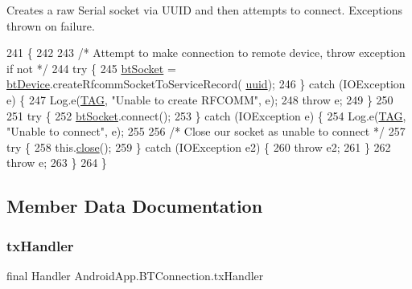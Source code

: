 Creates a raw Serial socket via U\+U\+ID and then attempts to connect. Exceptions thrown on failure. 
\begin{DoxyCode}
241                                               \{
242 
243         \textcolor{comment}{/* Attempt to make connection to remote device, throw exception if not */}
244         \textcolor{keywordflow}{try} \{
245             \hyperlink{class_android_app_1_1_b_t_connection_af3cdc6c880b28361d87d0118ace0e49c}{btSocket} = \hyperlink{class_android_app_1_1_b_t_connection_a3ed1e51b0f24f0b20ca5c27270f2999c}{btDevice}.createRfcommSocketToServiceRecord(
      \hyperlink{class_android_app_1_1_b_t_connection_a0e531d4cad0e5cca1e5b4446551b5c63}{uuid});
246         \} \textcolor{keywordflow}{catch} (IOException e) \{
247             Log.e(\hyperlink{class_android_app_1_1_b_t_connection_ad838024d59c68be866b5db329d6f6230}{TAG}, \textcolor{stringliteral}{"Unable to create RFCOMM"}, e);
248             \textcolor{keywordflow}{throw} e;
249         \}
250 
251         \textcolor{keywordflow}{try} \{
252             \hyperlink{class_android_app_1_1_b_t_connection_af3cdc6c880b28361d87d0118ace0e49c}{btSocket}.connect();
253         \} \textcolor{keywordflow}{catch} (IOException e) \{
254             Log.e(\hyperlink{class_android_app_1_1_b_t_connection_ad838024d59c68be866b5db329d6f6230}{TAG}, \textcolor{stringliteral}{"Unable to connect"}, e);
255 
256             \textcolor{comment}{/* Close our socket as unable to connect */}
257             \textcolor{keywordflow}{try} \{
258                 this.\hyperlink{class_android_app_1_1_b_t_connection_a37bb3e5c1dcf6b78a73239f6f62ab6d8}{close}();
259             \} \textcolor{keywordflow}{catch} (IOException e2) \{
260                 \textcolor{keywordflow}{throw} e2;
261             \}
262             \textcolor{keywordflow}{throw} e;
263         \}
264     \}
\end{DoxyCode}


\subsection{Member Data Documentation}
\mbox{\label{class_android_app_1_1_b_t_connection_a3236a74297d91f15dd63efc66f03a821}} 
\subsubsection{\texorpdfstring{tx\+Handler}{txHandler}}
{\footnotesize\ttfamily final Handler Android\+App.\+B\+T\+Connection.\+tx\+Handler}

